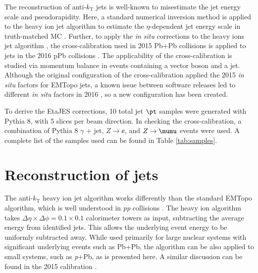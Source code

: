 \documentclass[NOTE, atlasdraft=true, texlive=2016, USenglish]{\ATLASLATEXPATH atlasdoc}
\begin{document}
The reconstruction of anti-$k_{\text{T}}$ jets is well-known to misestimate the jet energy scale and pseudorapidity. Here, a standard numerical inversion method is applied to the heavy ion jet algorithm to estimate the $\eta$-dependent jet energy scale in truth-matched MC \cite{ATL-COM-PHYS-2014-795}. Further, to apply the \textit{in situ} corrections to the heavy ions jet algorithm \cite{ATLAS-CONF-2015-017}, the cross-calibration used in 2015 Pb+Pb collisions is applied to jets in the 2016 pPb collisions . The applicability of the cross-calibration is studied via momentum balance in events containing a vector boson and a jet. Although the original configuration of the cross-calibration applied the 2015 \textit{in situ} factors for EMTopo jets, a known issue between software releases led to different \textit{in situ} factors in 2016 \cite{ATLAS-CONF-2015-017}, so a new configuration has been created.\par
To derive the EtaJES corrections, 10 total jet $\pt$ samples were generated with Pythia 8, with 5 slices per beam direction. In checking the cross-calibration, a combination of Pythia 8 $\gamma$ + jet, $Z\rightarrow\ee$, and $Z\rightarrow\mumu$ events were used. A complete list of the samples used can be found in Table \ref{tab:samples}.


\section{Reconstruction of jets}
\label{sec:reconstruction}

The anti-$k_{\text{T}}$ heavy ion jet algorithm works differently than the standard EMTopo algorithm, which is well understood in \textit{pp} collisions \cite{Cacciari:2008gp}. The heavy ion algorithm takes $\Delta\eta\times\Delta\phi=0.1\times0.1$ calorimeter towers as input, subtracting the average energy from identified jets. This allows the underlying event energy to be uniformly subtracted away. While used primarily for large nuclear systems with significant underlying events such as Pb+Pb, the algorithm can be also applied to small systems, such as \textit{p}+Pb, as is presented here. A similar discussion can be found in the 2015 calibration \cite{ATL-COM-PHYS-2016-101}.\par
\end{document}
